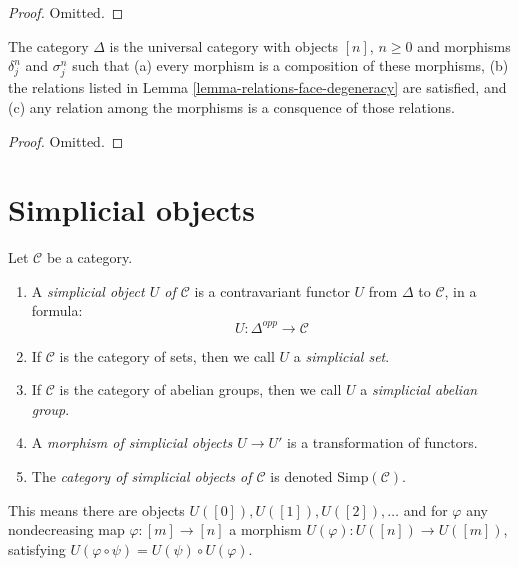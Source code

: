 \begin{proof}
Omitted.
\end{proof}

\begin{lemma}
\label{lemma-face-degeneracy-category}
The category $\Delta$ is the universal category
with objects $[n]$, $n \geq 0$ and morphisms
$\delta^n_j$ and $\sigma^n_j$ such that (a) every morphism is
a composition of these morphisms, (b) the relations
listed in Lemma \ref{lemma-relations-face-degeneracy} are satisfied,
and (c) any relation among the morphisms is a consquence of
those relations.
\end{lemma}

\begin{proof}
Omitted.
\end{proof}







\section{Simplicial objects}
\label{section-simplicial-object}

\begin{definition}
\label{definition-simplicial-object}
Let $\mathcal{C}$ be a category.
\begin{enumerate}
\item A {\it simplicial object $U$ of $\mathcal{C}$}
is a contravariant functor $U$ from $\Delta$ to
$\mathcal{C}$, in a formula:
$$
U : \Delta^{opp} \longrightarrow \mathcal{C}
$$
\item If $\mathcal{C}$ is the category of sets, then we call
$U$ a {\it simplicial set}.
\item If $\mathcal{C}$ is the category of abelian groups,
then we call $U$ a {\it simplicial abelian group}.
\item A {\it morphism of simplicial objects $U \to U'$}
is a transformation of functors.
\item The {\it category of simplicial objects of $\mathcal{C}$}
is denoted $\text{Simp}(\mathcal{C})$.
\end{enumerate}
\end{definition}

\noindent
This means there are objects $U([0]), U([1]), U([2]), \ldots$
and for $\varphi$ any nondecreasing map $\varphi : [m] \to [n]$
a morphism $U(\varphi) : U([n]) \to U([m])$, satisfying
$U(\varphi \circ \psi) = U(\psi) \circ U(\varphi)$.

